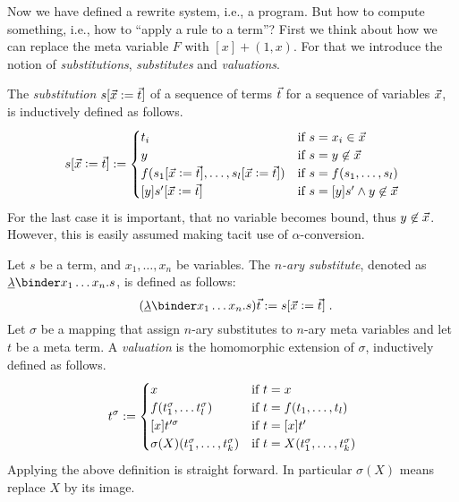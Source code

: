 Now we have defined a rewrite system, i.e., a program. But
how to compute something, i.e., how to ``apply a rule to a term''?
First we think about how we can replace the meta variable $F$ with
$[x]\plus(1, x)$. For that we introduce the notion of \emph{substitutions},
\emph{substitutes} and \emph{valuations}.

The \emph{substitution} $s[\vec{x} \mathrel{:=} \vec{t}]$ of a sequence of terms $\vec{t}$ 
for a sequence of variables $\vec{x}$, is inductively defined as follows.
%
\[ 
  s[ \vec{x} \mathrel{\mathrel{\mathop:}=} \vec{t} ] \mathrel{:=}
  \begin{cases}
    t_i  
      & \text{if } s = x_i  \in \vec{x} \\
    y    
      & \text{if } s = y \not\in \vec{x} \\
    f( s_1[\vec{x} \mathrel{\mathrel{\mathop:}=} \vec{t}], \ldots, s_l[\vec{x} \mathrel{\mathrel{\mathop:}=} \vec{t}]) 
      & \text{if } s = f(s_1, \ldots, s_l) \\
    [y] s'[\vec{x} \mathrel{\mathrel{\mathop:}=} \vec{t}]
      & \text{if } s = [y] s' \wedge y \not\in \vec{x} \\
  \end{cases}
  \]
%
For the last case it is important, that no variable becomes bound,
thus $ y \not\in \vec{x}$. However, this is easily assumed making
tacit use of $\alpha$-conversion.

Let $s$ be a term, and $ x_1, \ldots, x_n$ be variables. 
The \emph{$n$-ary substitute}, denoted as $\ULAM x_1 \ldots x_n. s$,
is defined as follows:
%
\begin{equation*}
  (\ULAM x_1 \ldots x_n. s) \ts \defsym s[ \xs \df \ts ] \tpkt
\end{equation*}
%
Let $\sigma$ be a mapping that assign $n$-ary substitutes to $n$-ary meta variables
and let $t$ be a meta term.
A \emph{valuation} is the homomorphic extension of $\sigma$, inductively
defined as follows. 
% 
\[
t^\sigma \defsym
% 
\begin{cases}
  x  
    & \text{if } t = x \\
  f( t_1^\sigma , \ldots t_l^\sigma) 
    & \text{if } t = f(t_1, \ldots, t_l) \\
   [x] t'^\sigma 
    & \text{if } t = [x] t' \\
   \sigma(X)(t_1^\sigma, \ldots, t_k^\sigma)
     & \text{if } t = X(t_1^\sigma, \ldots, t_k^\sigma) \\
\end{cases}
\]
%
Applying the above definition is straight forward. In
particular $\sigma(X)$ means replace $X$ by its image. 

